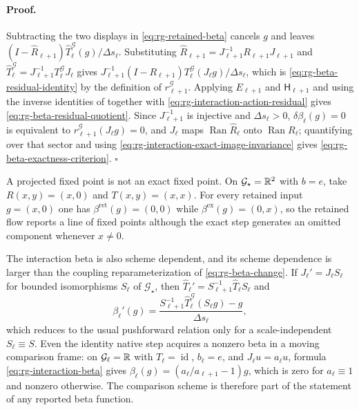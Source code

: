 \paragraph{Proof.}
Subtracting the two displays in \eqref{eq:rg-retained-beta} cancels $g$ and
leaves $(I-\widehat R_{\ell+1})\widehat T_\ell^{\mathcal G}(g)/\Delta s_\ell$.
Substituting $\widehat R_{\ell+1}=J_{\ell+1}^{-1}R_{\ell+1}J_{\ell+1}$ and
$\widehat T_\ell^{\mathcal G}=J_{\ell+1}^{-1}T_\ell^{\mathcal G}J_\ell$ gives
$J_{\ell+1}^{-1}(I-R_{\ell+1})T_\ell^{\mathcal G}(J_\ell g)/\Delta s_\ell$, which
is \eqref{eq:rg-beta-residual-identity} by the definition of
$r_{\ell+1}^{\mathcal G}$.  Applying $E_{\ell+1}$ and
$\mathsf H_{\ell+1}$ and using the
inverse identities of  together with
\eqref{eq:rg-interaction-action-residual} gives
\eqref{eq:rg-beta-residual-quotient}.  Since $J_{\ell+1}^{-1}$ is injective and
$\Delta s_\ell>0$, $\delta\beta_\ell(g)=0$ is equivalent to
$r_{\ell+1}^{\mathcal G}(J_\ell g)=0$, and $J_\ell$ maps
$\operatorname{Ran}\widehat R_\ell$ onto $\operatorname{Ran}R_\ell$; quantifying
over that sector and using
\eqref{eq:rg-interaction-exact-image-invariance} gives
\eqref{eq:rg-beta-exactness-criterion}.  $\square$

A projected fixed point is not an exact fixed point.  On
$\mathcal G_\star=\mathbb R^2$ with $b=e$, take $R(x,y)=(x,0)$ and $T(x,y)=(x,x)$.  For
every retained input $g=(x,0)$ one has $\beta^{\mathrm{ret}}(g)=(0,0)$ while
$\beta^{\mathrm{ex}}(g)=(0,x)$, so the retained flow reports a line of fixed
points although the exact step generates an omitted component whenever
$x\neq0$. 

The interaction beta is also scheme dependent, and its scheme dependence is
larger than the coupling reparameterization of
\eqref{eq:rg-beta-change}.  If $J_\ell'=J_\ell S_\ell$ for bounded isomorphisms
$S_\ell$ of $\mathcal G_\star$, then
$\widehat T_\ell'=S_{\ell+1}^{-1}\widehat T_\ell S_\ell$ and
\begin{equation}
\beta_\ell'(g)
=\frac{S_{\ell+1}^{-1}\widehat T_\ell^{\mathcal G}(S_\ell g)-g}{\Delta s_\ell},
\label{eq:rg-interaction-beta-scheme-change}
\end{equation}
which reduces to the usual pushforward relation only for a scale-independent
$S_\ell\equiv S$.  Even the identity native step acquires a nonzero beta in a
moving comparison frame: on $\mathcal G_\ell=\mathbb R$ with $T_\ell=\operatorname{id}$,
$b_\ell=e$, and $J_\ell u=a_\ell u$, formula \eqref{eq:rg-interaction-beta} gives
$\beta_\ell(g)=(a_\ell/a_{\ell+1}-1)g$, which is zero for $a_\ell\equiv1$ and
nonzero otherwise.  The comparison scheme is therefore part of the statement of
any reported beta function. 

